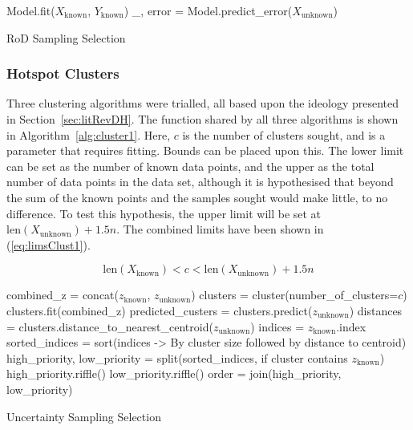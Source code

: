 \begin{algorithm}[H]
    Model.fit($X_\mathrm{known}$, $Y_\mathrm{known}$)\;
    \_, error = Model.predict\_error($X_\mathrm{unknown}$)\;
    \caption{RoD Sampling Selection}
    \label{alg:rod}\SetAlgoLined
\end{algorithm}

\subsubsection{Hotspot Clusters}
Three clustering algorithms were trialled, all based upon the ideology presented in Section~\ref{sec:litRevDH}. The function shared by all three algorithms is shown in Algorithm~\ref{alg:cluster1}. Here, $c$ is the number of clusters sought, and is a parameter that requires fitting. Bounds can be placed upon this. The lower limit can be set as the number of known data points, and the upper as the total number of data points in the data set, although it is hypothesised that beyond the sum of the known points and the samples sought would make little, to no difference. To test this hypothesis, the upper limit will be set at $\mathrm{len}(X_\mathrm{unknown})+1.5n$. The combined limits have been shown in (\ref{eq:limsClust1}).

\begin{equation}
    \label{eq:limsClust1}
    {\mathrm{len}(X_\mathrm{known})<c<\mathrm{len}(X_\mathrm{unknown})+1.5n}
\end{equation}

\begin{algorithm}[H]
    combined\_z = concat($z_\mathrm{known}$, $z_\mathrm{unknown}$)\;
    clusters = cluster(number\_of\_clusters=$c$)\;
    clusters.fit(combined\_z)\;
    predicted\_custers = clusters.predict($z_\mathrm{unknown}$)\;
    distances = clusters.distance\_to\_nearest\_centroid($z_\mathrm{unknown}$)\;
    indices = $z_\mathrm{known}$.index\;
    sorted\_indices = sort(indices -> By cluster size followed by distance to centroid) \;
    high\_priority, low\_priority = split(sorted\_indices, if cluster contains $z_\mathrm{known}$)\;
    high\_priority.riffle()\;
    low\_priority.riffle()\;
    order = join(high\_priority, low\_priority)\;

    \caption{Uncertainty Sampling Selection}
    \label{alg:cluster1}\SetAlgoLined
\end{algorithm}

